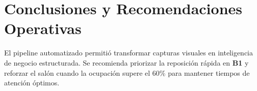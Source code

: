 \documentclass[12pt,a4paper]{article}
\begin{document}
\section{Conclusiones y Recomendaciones Operativas}
El pipeline automatizado permitió transformar capturas visuales en inteligencia de negocio estructurada. Se recomienda priorizar la reposición rápida en \textbf{B1} y reforzar el salón cuando la ocupación supere el 60\% para mantener tiempos de atención óptimos.
\end{document}
